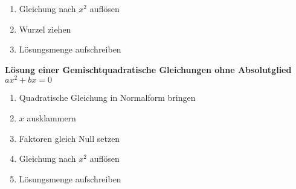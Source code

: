 \begin{multicols*}{3}
    \begin{enumerate}
        \item Gleichung nach $x^2$ auflösen
        \item Wurzel ziehen
        \item Lösungsmenge aufschreiben
    \end{enumerate}
    \textbf{Lösung einer Gemischtquadratische Gleichungen ohne Absolutglied $ax^2 + bx = 0$}

    \begin{enumerate}
        \item Quadratische Gleichung in Normalform bringen
        \item $x$ ausklammern
        \item  Faktoren gleich Null setzen
        \item Gleichung nach $x^2$ auflösen
        \item Lösungsmenge aufschreiben
    \end{enumerate}


\end{multicols*}
